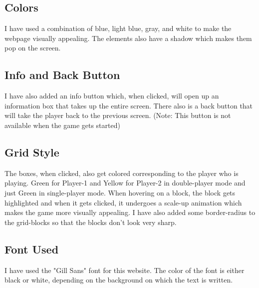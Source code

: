 \documentclass{article}
\begin{document}
\subsection{Colors}
I have used a combination of blue, light blue, gray, and white to make the webpage visually appealing. The elements also have a shadow which makes them pop on the screen. 
\subsection{Info and Back Button}
I have also added an info button which, when clicked, will open up an information box that takes up the entire screen. There also is a back button that will take the player back to the previous screen. (Note: This button is not available when the game gets started)
\subsection{Grid Style \autocite{ref1}}
The boxes, when clicked, also get colored corresponding to the player who is playing. Green for Player-1 and Yellow for Player-2 in double-player mode and just Green in single-player mode. When hovering on a block, the block gets highlighted and when it gets clicked, it undergoes a scale-up animation\autocite{ref2,ref3} which makes the game more visually appealing. I have also added some border-radius to the grid-blocks so that the blocks don't look very sharp.
\subsection{Font Used}
I have used the "Gill Sans" font for this website. The color of the font is either black or white, depending on the background on which the text is written. 
\end{document}
